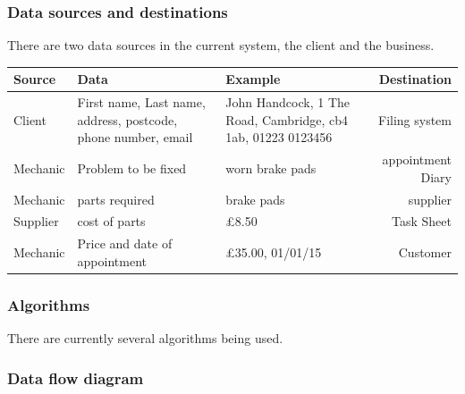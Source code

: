 \documentclass{article}
\begin{document}
	\subsubsection{Data sources and destinations}
		There are  two data sources in the current system, the client and the business.
		

\begin{tabular}{l|p{4cm}|p{4cm}|r}
\hline
Source & Data & Example & Destination\\ \hline
Client & First name, Last name, address, postcode, phone number, email & John Handcock, 1 The Road, Cambridge, cb4 1ab, 01223 0123456  & Filing system\\ \hline
Mechanic & Problem to be fixed & worn brake pads & appointment Diary\\ \hline
Mechanic & parts required & brake pads & supplier \\ \hline
Supplier & cost of parts & £8.50 & Task Sheet \\ \hline
Mechanic & Price and date of appointment & £35.00, 01/01/15 & Customer \\ 

\hline
\end{tabular}



	\subsubsection{Algorithms}
		There are currently several algorithms being used.
		

		


	\subsubsection{Data flow diagram}
	
\end{document}
